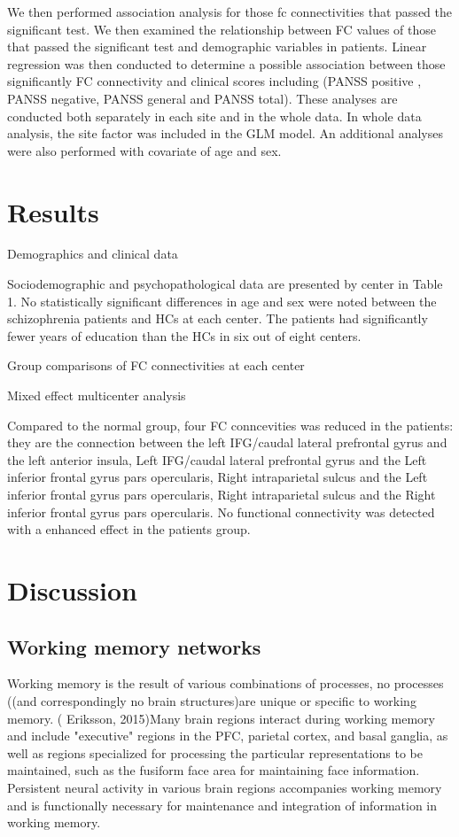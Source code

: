 \documentclass[preprint,authoryear,review,12pt]{elsarticle}
\begin{document}
We then performed association analysis for those fc connectivities that passed the significant test. We then examined the relationship between FC values of those that passed the significant test and demographic variables in patients.  Linear regression was then conducted to determine a possible association between those significantly FC connectivity and clinical scores including (PANSS positive , PANSS negative, PANSS general and PANSS total). These analyses are conducted both separately in each site and in the whole data. In whole data analysis, the site factor was included in the GLM model. An additional analyses were also performed with covariate of age and sex.

\section*{Results}

Demographics and clinical data

Sociodemographic and psychopathological data are presented by center in Table 1. No statistically significant differences in age and sex were noted between the schizophrenia patients and HCs at each center. The patients had significantly fewer years of education than the HCs in six out of eight centers.

Group comparisons of FC connectivities at each center

Mixed effect multicenter analysis

Compared to the normal group, four FC conncevities was reduced in the patients: they are the connection between the left IFG/caudal lateral prefrontal gyrus and the left anterior insula, Left IFG/caudal lateral prefrontal gyrus and the Left inferior frontal gyrus pars opercularis, Right intraparietal sulcus and the Left inferior frontal gyrus pars opercularis, Right intraparietal sulcus and the Right inferior frontal gyrus pars opercularis. No functional connectivity was detected with a enhanced effect in the patients group.  

\section*{Discussion} 

\subsection*{Working memory networks}


Working memory is the result of various combinations of processes, no processes ((and correspondingly no brain structures)are unique or specific to working memory. ( Eriksson, 2015)Many brain regions interact during working memory and include "executive" regions in the PFC, parietal cortex, and basal ganglia, as well as regions specialized for processing the particular representations to be maintained, such as the fusiform face area for maintaining face information. Persistent neural activity in various brain regions accompanies working memory and is functionally necessary for maintenance and integration of information in working memory.
\end{document}
